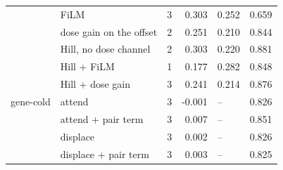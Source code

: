 \begin{table}[htbp]
\begin{tabular}{llrrlr}
 & FiLM & 3 & 0.303 & 0.252 & 0.659 \\
 & dose gain on the offset & 2 & 0.251 & 0.210 & 0.844 \\
 & Hill, no dose channel & 2 & 0.303 & 0.220 & 0.881 \\
 & Hill + FiLM & 1 & 0.177 & 0.282 & 0.848 \\
 & Hill + dose gain & 3 & 0.241 & 0.214 & 0.876 \\
\midrule
gene-cold & attend & 3 & -0.001 & -- & 0.826 \\
 & attend + pair term & 3 & 0.007 & -- & 0.851 \\
 & displace & 3 & 0.002 & -- & 0.826 \\
 & displace + pair term & 3 & 0.003 & -- & 0.825 \\
\bottomrule
\end{tabular}
\end{table}
